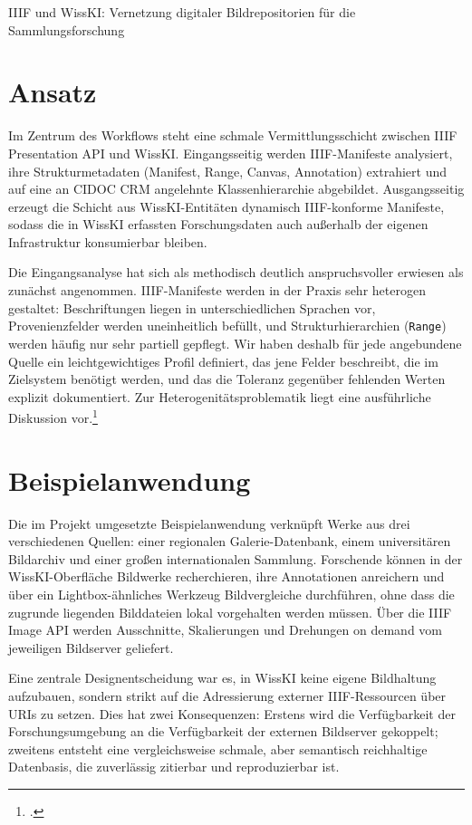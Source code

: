 \begin{beitrag}{IIIF und WissKI: Vernetzung digitaler Bildrepositorien für die Sammlungsforschung}
\section{Ansatz}
Im Zentrum des Workflows steht eine schmale Vermittlungsschicht zwischen IIIF Presentation API und WissKI. Eingangsseitig werden IIIF-Manifeste analysiert, ihre Strukturmetadaten (Manifest, Range, Canvas, Annotation) extrahiert und auf eine an CIDOC CRM angelehnte Klassenhierarchie abgebildet. Ausgangsseitig erzeugt die Schicht aus WissKI-Entitäten dynamisch IIIF-konforme Manifeste, sodass die in WissKI erfassten Forschungsdaten auch außerhalb der eigenen Infrastruktur konsumierbar bleiben.

Die Eingangsanalyse hat sich als methodisch deutlich anspruchsvoller erwiesen als zunächst angenommen. IIIF-Manifeste werden in der Praxis sehr heterogen gestaltet: Beschriftungen liegen in unterschiedlichen Sprachen vor, Provenienzfelder werden uneinheitlich befüllt, und Strukturhierarchien (\texttt{Range}) werden häufig nur sehr partiell gepflegt. Wir haben deshalb für jede angebundene Quelle ein leichtgewichtiges Profil definiert, das jene Felder beschreibt, die im Zielsystem benötigt werden, und das die Toleranz gegenüber fehlenden Werten explizit dokumentiert. Zur Heterogenitätsproblematik liegt eine ausführliche Diskussion vor.\footcite[305]{engel2024-iiif-heterogen}

\section{Beispielanwendung}
Die im Projekt umgesetzte Beispielanwendung verknüpft Werke aus drei verschiedenen Quellen: einer regionalen Galerie-Datenbank, einem universitären Bildarchiv und einer großen internationalen Sammlung. Forschende können in der WissKI-Oberfläche Bildwerke recherchieren, ihre Annotationen anreichern und über ein Lightbox-ähnliches Werkzeug Bildvergleiche durchführen, ohne dass die zugrunde liegenden Bilddateien lokal vorgehalten werden müssen. Über die IIIF Image API werden Ausschnitte, Skalierungen und Drehungen on demand vom jeweiligen Bildserver geliefert.

Eine zentrale Designentscheidung war es, in WissKI keine eigene Bildhaltung aufzubauen, sondern strikt auf die Adressierung externer IIIF-Ressourcen über URIs zu setzen. Dies hat zwei Konsequenzen: Erstens wird die Verfügbarkeit der Forschungsumgebung an die Verfügbarkeit der externen Bildserver gekoppelt; zweitens entsteht eine vergleichsweise schmale, aber semantisch reichhaltige Datenbasis, die zuverlässig zitierbar und reproduzierbar ist.


\end{beitrag}
